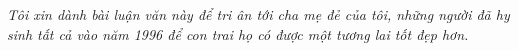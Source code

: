 \begin{titlepage}
	\centering
	\vfill
	{\viet\textit{Tôi xin dành bài luận văn này để tri ân tới cha mẹ đẻ của tôi, những người đã hy sinh tất cả vào năm 1996 để con trai họ có được một tương lai tốt đẹp hơn.}}
	\vfill
\end{titlepage}